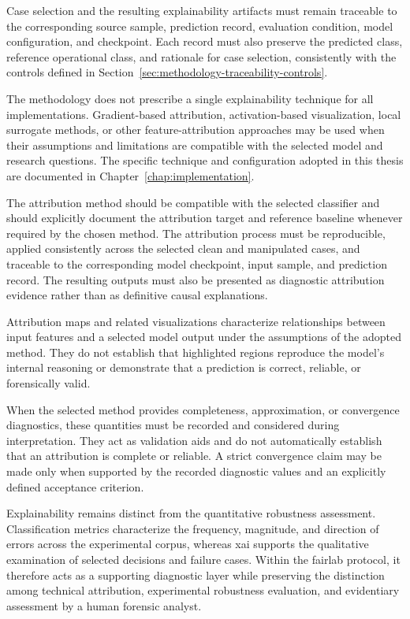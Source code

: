 Case selection and the resulting explainability artifacts must remain
traceable to the corresponding source sample, prediction record, evaluation
condition, model configuration, and checkpoint. Each record must also preserve
the predicted class, reference operational class, and rationale for case
selection, consistently with the controls defined in
Section~\ref{sec:methodology-traceability-controls}.

The methodology does not prescribe a single explainability technique for all
implementations. Gradient-based attribution, activation-based visualization,
local surrogate methods, or other feature-attribution approaches may be used
when their assumptions and limitations are compatible with the selected model
and research questions. The specific technique and configuration adopted in
this thesis are documented in Chapter~\ref{chap:implementation}.

The attribution method should be compatible with the selected classifier and
should explicitly document the attribution target and reference
baseline whenever required by the chosen method. The attribution process must
be reproducible, applied consistently across the selected clean and manipulated
cases, and traceable to the corresponding model checkpoint, input sample, and
prediction record. The resulting outputs must also be presented as diagnostic
attribution evidence rather than as definitive causal explanations.

Attribution maps and related visualizations characterize relationships between
input features and a selected model output under the assumptions of the adopted
method. They do not establish that highlighted regions reproduce the model's
internal reasoning or demonstrate that a prediction is correct, reliable, or
forensically valid.

When the selected method provides completeness, approximation, or convergence
diagnostics, these quantities must be recorded and considered during
interpretation. They act as validation aids and do not automatically establish
that an attribution is complete or reliable. A strict convergence claim may be
made only when supported by the recorded diagnostic values and an explicitly
defined acceptance criterion.

Explainability remains distinct from the quantitative robustness assessment.
Classification metrics characterize the frequency, magnitude, and direction of
errors across the experimental corpus, whereas \gls{xai} supports the
qualitative examination of selected decisions and failure cases. Within the
\gls{fairlab} protocol, it therefore acts as a supporting diagnostic layer
while preserving the distinction among technical attribution, experimental
robustness evaluation, and evidentiary assessment by a human forensic analyst.


